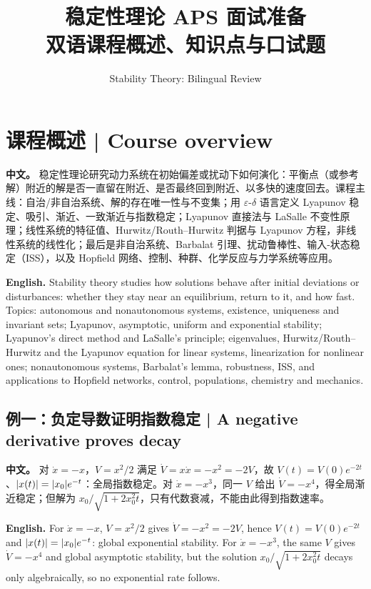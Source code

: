 \documentclass[UTF8,11pt,a4paper]{ctexart}
\title{稳定性理论 APS 面试准备\\[4pt]\large 双语课程概述、知识点与口试题}
\author{Stability Theory: Bilingual Review}
\date{}
\newcommand{\APS}[2]{\par\noindent\textbf{中文。} #1\par\noindent\textbf{English.} #2\par}
\begin{document}
\maketitle

\section*{课程概述 | Course overview}
\APS{稳定性理论研究动力系统在初始偏差或扰动下如何演化：平衡点（或参考解）附近的解是否一直留在附近、是否最终回到附近、以多快的速度回去。课程主线：自治/非自治系统、解的存在唯一性与不变集；用 $\varepsilon$-$\delta$ 语言定义 Lyapunov 稳定、吸引、渐近、一致渐近与指数稳定；Lyapunov 直接法与 LaSalle 不变性原理；线性系统的特征值、Hurwitz/Routh--Hurwitz 判据与 Lyapunov 方程，非线性系统的线性化；最后是非自治系统、Barbalat 引理、扰动鲁棒性、输入-状态稳定（ISS），以及 Hopfield 网络、控制、种群、化学反应与力学系统等应用。}{Stability theory studies how solutions behave after initial deviations or disturbances: whether they stay near an equilibrium, return to it, and how fast. Topics: autonomous and nonautonomous systems, existence, uniqueness and invariant sets; Lyapunov, asymptotic, uniform and exponential stability; Lyapunov's direct method and LaSalle's principle; eigenvalues, Hurwitz/Routh--Hurwitz and the Lyapunov equation for linear systems, linearization for nonlinear ones; nonautonomous systems, Barbalat's lemma, robustness, ISS, and applications to Hopfield networks, control, populations, chemistry and mechanics.}

\subsection*{例一：负定导数证明指数稳定 | A negative derivative proves decay}
\APS{对 $\dot x=-x$，$V=x^2/2$ 满足 $\dot V=x\dot x=-x^2=-2V$，故 $V(t)=V(0)e^{-2t}$、$\lvert x(t)\rvert=\lvert x_0\rvert e^{-t}$：全局指数稳定。对 $\dot x=-x^3$，同一 $V$ 给出 $\dot V=-x^4$，得全局渐近稳定；但解为 $x_0/\sqrt{1+2x_0^2t}$，只有代数衰减，不能由此得到指数速率。}{For $\dot x=-x$, $V=x^2/2$ gives $\dot V=-x^2=-2V$, hence $V(t)=V(0)e^{-2t}$ and $\lvert x(t)\rvert=\lvert x_0\rvert e^{-t}$: global exponential stability. For $\dot x=-x^3$, the same $V$ gives $\dot V=-x^4$ and global asymptotic stability, but the solution $x_0/\sqrt{1+2x_0^2t}$ decays only algebraically, so no exponential rate follows.}
\end{document}
